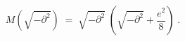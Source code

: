 \begin{equation}
 M(\sqrt{-\partial^2})\;=\; \sqrt{-\partial^2} \; ( \sqrt{-\partial^2}
+ \frac{e^2}{8}) \;.
\end{equation}


